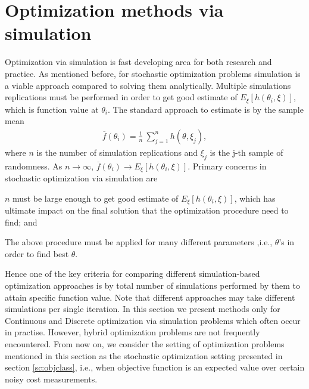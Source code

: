 \section{Optimization methods via simulation }\label{sc:dis}
Optimization via simulation is fast developing area for both research and practice. As mentioned before, for stochastic optimization problems simulation is a viable approach compared to solving them analytically. Multiple simulations replications must be performed in order to get good estimate of $E_{\xi}[h(\theta_i,\xi)]$, which is function value at $\theta_i$. The standard approach to estimate is by the sample mean
\begin{align}\label{eq:sm}
\overline f(\theta_i) = \frac{1}{n} ~  \sum_{j=1}^{n} h(\theta,\xi_j),
\end{align}
where $n$ is the number of simulation replications and $\xi_j$ is the j-th sample of randomness. As $n \to \infty$, $\overline f(\theta_i) \to E_{\xi}[h(\theta_i,\xi)]$. Primary concerns in stochastic optimization via simulation are 
\begin{inparaenum}[\bfseries (i)]
	\item $n$ must be large enough to get good estimate of  $E_{\xi}[h(\theta_i,\xi)]$, which has ultimate impact on the final solution that the optimization procedure need to find; and
	\item The above procedure must be applied for many different parameters ,i.e., $\theta$'s in order to find best $\theta$.
\end{inparaenum}
Hence one of the key criteria for comparing different simulation-based optimization approaches is by total number of simulations performed by them to attain specific function value. Note that different approaches may take different simulations per single iteration. In this section we present methods only for Continuous and Discrete optimization via simulation problems which often occur in practise. However, hybrid optimization problems are not frequently encountered. From  now on, we consider the setting of optimization problems mentioned in this section as the stochastic optimization setting presented in section \ref{sc:objclass}, i.e., when objective function is an expected value over certain noisy cost measurements. 
